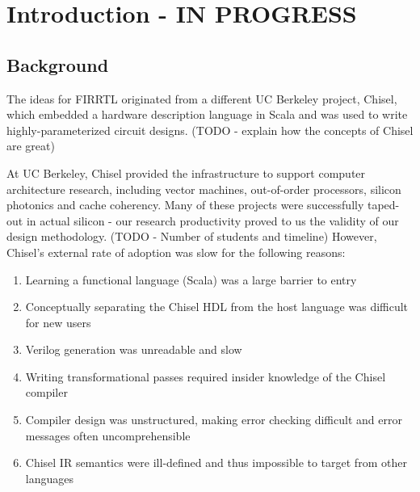 \documentclass[12pt]{article}
\begin{document}
\maketitle
\tableofcontents

\newcommand{\id}{\text{id }}
\newcommand{\ids}{\text{id}}
\newcommand{\ints}{\text{int}}
\newcommand{\intsp}{\text{int }}
\newcommand{\kw}[1]{\text{\bf #1\ }}
\newcommand{\kws}[1]{\text{\bf #1}}
\newcommand{\pd}[1]{\text{\em #1\ }}
\newcommand{\pds}[1]{\text{\em #1}}
\newcommand{\bundleT}[1]{\{#1\}}
\newcommand{\info}{[\pds{info}]\ }

\section{Introduction - IN PROGRESS}

\subsection{Background}
The ideas for FIRRTL originated from a different UC Berkeley project, Chisel, which embedded a hardware description language in Scala and was used to write highly-parameterized circuit designs.
(TODO - explain how the concepts of Chisel are great)

At UC Berkeley, Chisel provided the infrastructure to support computer architecture research, including vector machines, out-of-order processors, silicon photonics and cache coherency.
Many of these projects were successfully taped-out in actual silicon - our research productivity proved to us the validity of our design methodology.
(TODO - Number of students and timeline)
However, Chisel's external rate of adoption was slow for the following reasons:
\begin{enumerate}[topsep=3pt,itemsep=-0.5ex,partopsep=1ex,parsep=1ex]
\item Learning a functional language (Scala) was a large barrier to entry
\item Conceptually separating the Chisel HDL from the host language was difficult for new users
\item Verilog generation was unreadable and slow
\item Writing transformational passes required insider knowledge of the Chisel compiler
\item Compiler design was unstructured, making error checking difficult and error messages often uncomprehensible
\item Chisel IR semantics were ill-defined and thus impossible to target from other languages
\end{enumerate}
\end{document}
